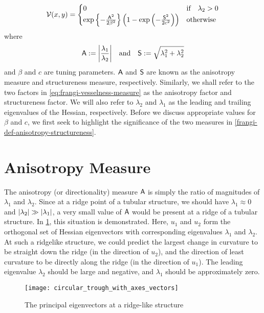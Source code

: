 \begin{equation} \label{eq:frangi-vesselness-measure}
\V(x,y) = \begin{cases}
0 & \text{if} \quad \lambda_2 > 0 \\
\exp\left\{-\frac{\Am^2}{2\beta^2}\right\}
\left(1 - \exp\left(-\frac{\Sm^2}{2c^2}\right)\right) & \text{otherwise}
\end{cases} \end{equation}
where
\begin{equation} \label{frangi-def-anisotropy-structureness}
\Am := \abs*{\frac{\lambda_1}{\lambda_2}}
\quad \textrm{and} \quad 
\Sm := \sqrt{\lambda_1^2 + \lambda_2^2}
\end{equation}
and $\beta$ and $c$ are tuning parameters. $\Am$ and $\Sm$ are known as the anisotropy measure and structureness measure, respectively. Similarly, we shall refer to the two factors in \cref{eq:frangi-vesselness-measure} as the anisotropy factor and structureness factor. We will also refer to $\lambda_2$ and $\lambda_1$ as the leading and trailing eigenvalues of the Hessian, respectively. Before we discuss appropriate values for $\beta$ and $c$, we first seek to highlight the significance of the two measures in \cref{frangi-def-anisotropy-structureness}.

\section{Anisotropy Measure} \label{sec:frangi.anisotropy}
The anisotropy (or directionality) measure $\Am$ is simply the ratio of magnitudes of $\lambda_1$ and $\lambda_2$. Since at a ridge point of a tubular structure, we should have $\lambda_1 \approx 0$ and $\abs*{\lambda_2} \gg \abs*{\lambda_1}$,
a very small value of $\Am$ would be present at a ridge of a tubular structure.
In \cref{fig:circular_trough_with_axes_vectors}, this situation is demonstrated. Here, $u_1$ and $u_2$ form the orthogonal set of Hessian eigenvectors with corresponding eigenvalues $\lambda_1$ and $\lambda_2$. At such a ridgelike structure, we could predict the largest change in curvature to be straight down the ridge (in the direction of $u_2$), and the direction of least curvature to be directly along the ridge (in the direction  of $u_1$). The leading eigenvalue $\lambda_2$ should be large and negative, and $\lambda_1$ should be approximately zero.

\begin{figure} \centering
  \texttt{[image: circular\_trough\_with\_axes\_vectors]}
  \caption{The principal eigenvectors at a ridge-like structure} 
  \label{fig:circular_trough_with_axes_vectors}
\end{figure}


